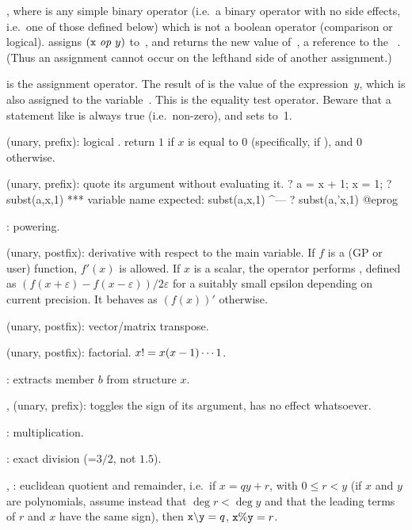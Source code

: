 %
, where  is any simple binary operator
(i.e.~a binary operator with no side effects, i.e.~one of those defined below)
which is not a boolean operator (comparison or logical).
 assigns $({\tt x}~\hbox{\it op\/}~y)$ to~,
and returns the new value of~,  a reference to the
~. (Thus an assignment cannot occur on the lefthand
side of another assignment.)

%
\kbd{=} is the assignment operator. The result of  is the value
of the expression~$y$, which is also assigned to the variable~. This
is  the equality test operator. Beware that a statement like
 is always true (i.e.~non-zero), and sets  to~1.

%
\kbd{!} (unary, prefix): logical .  return $1$ if $x$ is
equal to $0$ (specifically, if ), and $0$ otherwise.

 (unary, prefix): quote its argument without evaluating it.
\bprog
? a = x + 1; x = 1;
? subst(a,x,1)
  ***   variable name expected: subst(a,x,1)
                                        ^---
? subst(a,'x,1)
@eprog

%
\kbd{\pow}: powering.

 (unary, postfix): derivative with respect to the main variable. If
$f$ is a (GP or user) function, $f'(x)$ is allowed. If $x$ is a scalar, the
operator performs , defined as $(f(x+\varepsilon) -
f(x-\varepsilon)) / 2\varepsilon$ for a suitably small epsilon depending on
current precision. It behaves as $(f(x))'$ otherwise.

\strut\kbd{\til} (unary, postfix): vector/matrix transpose.

\kbd{!} (unary, postfix): factorial. $x{\tt !}=x(x-1)\cdots 1$.

:  extracts member $b$ from structure $x$.

%
\kbd{+}, \kbd{-} (unary, prefix): \kbd{-} toggles the sign of its argument,
\kbd{+} has no effect whatsoever.

%
\kbd{*}: multiplication.

\kbd{/}: exact division (=$3/2$, not $1.5$).

\kbd{\bs}, \kbd{\%}: euclidean quotient and remainder, i.e.~if $x =
qy + r$, with $0\le r < y$ (if $x$ and $y$ are polynomials, assume instead
that $\deg r< \deg y$ and that the leading terms of $r$ and $x$ have the
same sign), then $\kbd{x \b{ } y} = q$, ${\tt x\%y} = r$.

